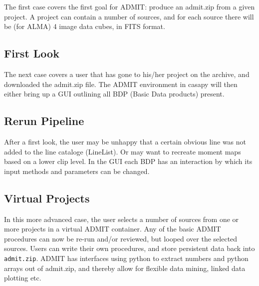 \documentclass{report}
\begin{document}
The first case covers the first goal for ADMIT:  produce an admit.zip from
a given project.   A project can contain a number of sources, and
for each source there will be (for ALMA) 4 image data cubes, in FITS
format.

\subsection{First Look}

The next case covers a user that has gone to his/her project on the
archive, and downloaded the admit.zip file. The ADMIT environment in
casapy will then either bring up a GUI outlining all BDP (Basic Data
products) present.

\subsection{Rerun Pipeline}

After a first look, the user may be unhappy that a certain obvious line
was not added to the line cataloge (LineList). Or may want to recreate
moment maps based on a lower clip level. In the GUI each BDP has an
interaction by which its input methods and parameters can be changed.

\subsection{Virtual Projects}

In this more advanced case, the user selects a number of sources from one
or more projects in a virtual ADMIT container. Any of the basic ADMIT procedures
can now be re-run and/or reviewed, but looped over the selected sources.
Users can write their own procedures,
and store persistent data back into {\tt admit.zip}. ADMIT has interfaces
using python to extract numbers and python arrays out of admit.zip, and thereby
allow for flexible data mining, linked data plotting etc.
\end{document}
